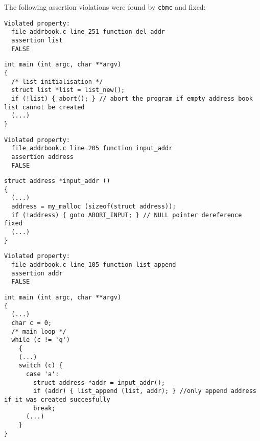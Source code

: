 The following assertion violations were found by \texttt{cbmc} and fixed: 
\begin{Verbatim}[fontsize=\footnotesize]
Violated property:
  file addrbook.c line 251 function del_addr
  assertion list
  FALSE
\end{Verbatim}
\begin{lstlisting}
int main (int argc, char **argv)
{
  /* list initialisation */
  struct list *list = list_new();
  if (!list) { abort(); } // abort the program if empty address book list cannot be created
  (...)
}
\end{lstlisting}

\begin{Verbatim}[fontsize=\footnotesize]
Violated property:
  file addrbook.c line 205 function input_addr
  assertion address
  FALSE
\end{Verbatim}
\begin{lstlisting}
struct address *input_addr ()
{
  (...)
  address = my_malloc (sizeof(struct address));
  if (!address) { goto ABORT_INPUT; } // NULL pointer dereference fixed
  (...)
}
\end{lstlisting}

\begin{Verbatim}[fontsize=\footnotesize]
Violated property:
  file addrbook.c line 105 function list_append
  assertion addr
  FALSE
\end{Verbatim}
\begin{lstlisting}
int main (int argc, char **argv)
{
  (...)
  char c = 0;
  /* main loop */
  while (c != 'q')
    {
    (...)
    switch (c) {
      case 'a': 
        struct address *addr = input_addr();
        if (addr) { list_append (list, addr); } //only append address if it was created succesfully
        break; 
      (...)
    }
}
\end{lstlisting}




% 

